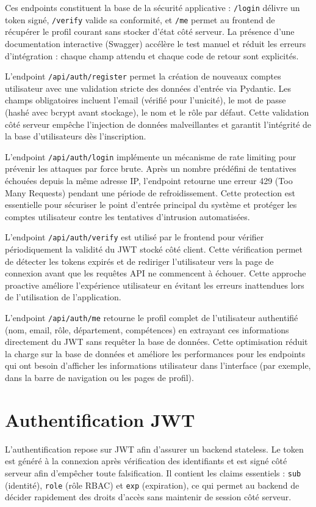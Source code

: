 \documentclass[12pt,a4paper]{report}
\begin{document}
Ces endpoints constituent la base de la sécurité applicative : \texttt{/login} délivre un token signé, \texttt{/verify} valide sa conformité, et \texttt{/me} permet au frontend de récupérer le profil courant sans stocker d'état côté serveur. La présence d'une documentation interactive (Swagger) accélère le test manuel et réduit les erreurs d'intégration : chaque champ attendu et chaque code de retour sont explicités.

L'endpoint \texttt{/api/auth/register} permet la création de nouveaux comptes utilisateur avec une validation stricte des données d'entrée via Pydantic. Les champs obligatoires incluent l'email (vérifié pour l'unicité), le mot de passe (hashé avec bcrypt avant stockage), le nom et le rôle par défaut. Cette validation côté serveur empêche l'injection de données malveillantes et garantit l'intégrité de la base d'utilisateurs dès l'inscription.

L'endpoint \texttt{/api/auth/login} implémente un mécanisme de rate limiting pour prévenir les attaques par force brute. Après un nombre prédéfini de tentatives échouées depuis la même adresse IP, l'endpoint retourne une erreur 429 (Too Many Requests) pendant une période de refroidissement. Cette protection est essentielle pour sécuriser le point d'entrée principal du système et protéger les comptes utilisateur contre les tentatives d'intrusion automatisées.

L'endpoint \texttt{/api/auth/verify} est utilisé par le frontend pour vérifier périodiquement la validité du JWT stocké côté client. Cette vérification permet de détecter les tokens expirés et de rediriger l'utilisateur vers la page de connexion avant que les requêtes API ne commencent à échouer. Cette approche proactive améliore l'expérience utilisateur en évitant les erreurs inattendues lors de l'utilisation de l'application.

L'endpoint \texttt{/api/auth/me} retourne le profil complet de l'utilisateur authentifié (nom, email, rôle, département, compétences) en extrayant ces informations directement du JWT sans requêter la base de données. Cette optimisation réduit la charge sur la base de données et améliore les performances pour les endpoints qui ont besoin d'afficher les informations utilisateur dans l'interface (par exemple, dans la barre de navigation ou les pages de profil).

\section{Authentification JWT}
L'authentification repose sur JWT afin d'assurer un backend stateless. Le token est généré à la connexion après vérification des identifiants et est signé côté serveur afin d'empêcher toute falsification. Il contient les claims essentiels : \texttt{sub} (identité), \texttt{role} (rôle RBAC) et \texttt{exp} (expiration), ce qui permet au backend de décider rapidement des droits d'accès sans maintenir de session côté serveur.
\end{document}

